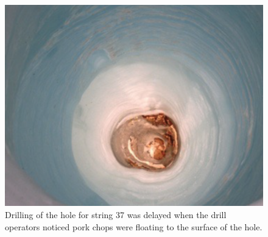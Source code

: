 \documentclass[main.tex]{subfiles}
\begin{document}
\begin{figure}
    \centering
    \includegraphics[width=0.6\linewidth]{figures/porkchops.png}
    \caption{Drilling of the hole for string 37 was delayed when the drill operators noticed pork chops were floating to the surface of the hole.}\label{fig:pork}
\end{figure}

%
\end{document}
